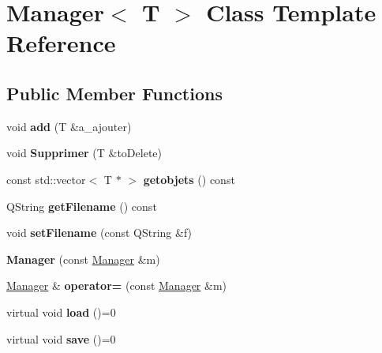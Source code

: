 \hypertarget{class_manager}{}\section{Manager$<$ T $>$ Class Template Reference}
\label{class_manager}
\subsection*{Public Member Functions}
\begin{DoxyCompactItemize}
\item 
\mbox{\label{class_manager_a4eac07f3408be9a9c86273383e282b53}} 
void {\bfseries add} (T \&a\+\_\+ajouter)
\item 
\mbox{\label{class_manager_a5ad1071a0ca361daea98576c433774c8}} 
void {\bfseries Supprimer} (T \&to\+Delete)
\item 
\mbox{\label{class_manager_a53786650c42236c2c346cda79cb3cee3}} 
const std\+::vector$<$ T $\ast$ $>$ {\bfseries getobjets} () const
\item 
\mbox{\label{class_manager_a5f6a3a94521559731ef49005d7669464}} 
Q\+String {\bfseries get\+Filename} () const
\item 
\mbox{\label{class_manager_a5da0f2b938c233c901d1b3f56ce6b77f}} 
void {\bfseries set\+Filename} (const Q\+String \&f)
\item 
\mbox{\label{class_manager_a5fe23721cb4bf2f0eafbb983e5ed48ac}} 
{\bfseries Manager} (const \hyperlink{class_manager}{Manager} \&m)
\item 
\mbox{\label{class_manager_a105090c64755ac39343b4aef80404727}} 
\hyperlink{class_manager}{Manager} \& {\bfseries operator=} (const \hyperlink{class_manager}{Manager} \&m)
\item 
\mbox{\label{class_manager_add6a6361b3ebef4e6e744c2b12f9e57d}} 
virtual void {\bfseries load} ()=0
\item 
\mbox{\label{class_manager_a952734cfd645e6b257ef19ab06d4ded4}} 
virtual void {\bfseries save} ()=0
\end{DoxyCompactItemize}
